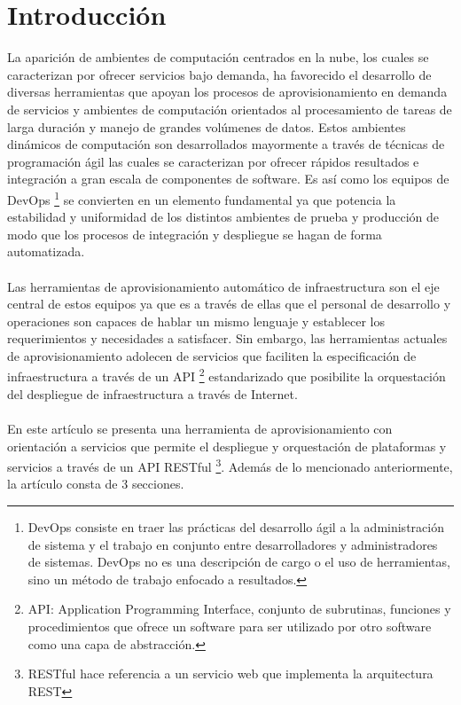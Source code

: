 \documentclass[conference, spanish]{IEEEtran}
\begin{document}
\section{Introducción}
La aparición de ambientes de computación centrados en la nube, los cuales se caracterizan por ofrecer servicios bajo demanda, ha favorecido el desarrollo de diversas herramientas que apoyan los procesos de aprovisionamiento en demanda de servicios y ambientes de computación orientados al procesamiento de tareas de larga duración y manejo de grandes volúmenes de datos. Estos ambientes dinámicos de computación son desarrollados mayormente a través de técnicas de programación ágil las cuales se caracterizan por ofrecer rápidos resultados e integración a gran escala de componentes de software. Es así como los equipos de DevOps \footnote{DevOps consiste en traer las prácticas del desarrollo ágil a la administración de sistema y el trabajo en conjunto entre desarrolladores y administradores de sistemas. DevOps no es una descripción de cargo o el uso de herramientas, sino un método de trabajo enfocado a resultados.} se convierten en un elemento fundamental ya que potencia la estabilidad y uniformidad de los distintos ambientes de prueba y producción de modo que los procesos de integración y despliegue se hagan de forma automatizada. \\
\\
Las herramientas de aprovisionamiento automático de infraestructura son el eje central de estos equipos ya que es a través de ellas que el personal de desarrollo y operaciones son capaces de hablar un mismo lenguaje y establecer los requerimientos y necesidades a satisfacer. Sin embargo, las herramientas actuales de aprovisionamiento adolecen de servicios que faciliten la especificación de infraestructura a través de un API \footnote{ API: Application Programming Interface, conjunto de subrutinas, funciones y procedimientos que ofrece un software para ser utilizado por otro software como una capa de abstracción.} estandarizado que posibilite la orquestación del despliegue de infraestructura a través de Internet.\\
\\
En este artículo se presenta una herramienta de aprovisionamiento con orientación a servicios que permite el despliegue y orquestación de plataformas y servicios a través de un API RESTful \footnote{RESTful hace referencia a un servicio web que implementa la arquitectura REST}. Además de lo mencionado anteriormente, la artículo consta de 3 secciones.\\
\end{document}

